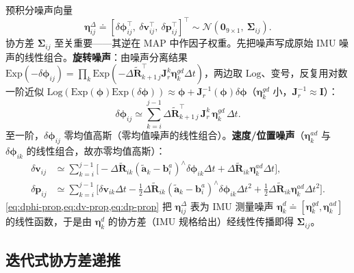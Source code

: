 预积分噪声向量
\begin{equation}
  \boldsymbol\eta_{ij}^\Delta\doteq[\delta\boldsymbol\phi_{ij}^\top,\ \delta\mathbf v_{ij}^\top,\ \delta\mathbf p_{ij}^\top]^\top\sim\mathcal N(\mathbf 0_{9\times1},\ \boldsymbol\Sigma_{ij}).
  \label{eq:imu-noise-vec}
\end{equation}
协方差 $\boldsymbol\Sigma_{ij}$ 至关重要——其逆在 MAP 中作因子权重。先把噪声写成原始 IMU 噪声的线性组合。\textbf{旋转噪声}：由噪声分离结果 $\mathrm{Exp}(-\delta\boldsymbol\phi_{ij})=\prod_k\mathrm{Exp}(-\Delta\tilde{\mathbf R}_{k+1\,j}^\top\mathbf J_r^k\boldsymbol\eta_k^{gd}\Delta t)$，两边取 $\mathrm{Log}$、变号，反复用对数一阶近似 $\mathrm{Log}(\mathrm{Exp}(\boldsymbol\phi)\mathrm{Exp}(\delta\boldsymbol\phi))\approx\boldsymbol\phi+\mathbf J_r^{-1}(\boldsymbol\phi)\delta\boldsymbol\phi$（$\boldsymbol\eta_k^{gd}$ 小，$\mathbf J_r^{-1}\approx\mathbf I$）：
\begin{equation}
  \delta\boldsymbol\phi_{ij}\simeq\sum_{k=i}^{j-1}\Delta\tilde{\mathbf R}_{k+1\,j}^\top\,\mathbf J_r^k\,\boldsymbol\eta_k^{gd}\,\Delta t.
  \label{eq:dphi-prop}
\end{equation}
至一阶，$\delta\boldsymbol\phi_{ij}$ 零均值高斯（零均值噪声的线性组合）。\textbf{速度/位置噪声}（$\boldsymbol\eta_k^{ad}$ 与 $\delta\boldsymbol\phi_{ik}$ 的线性组合，故亦零均值高斯）：
\begin{align}
  \delta\mathbf v_{ij}&\simeq\sum_{k=i}^{j-1}\Big[-\Delta\tilde{\mathbf R}_{ik}(\tilde{\mathbf a}_k-\mathbf b_i^a)^\wedge\delta\boldsymbol\phi_{ik}\Delta t+\Delta\tilde{\mathbf R}_{ik}\boldsymbol\eta_k^{ad}\Delta t\Big],\label{eq:dv-prop}\\
  \delta\mathbf p_{ij}&\simeq\sum_{k=i}^{j-1}\Big[\delta\mathbf v_{ik}\Delta t-\tfrac12\Delta\tilde{\mathbf R}_{ik}(\tilde{\mathbf a}_k-\mathbf b_i^a)^\wedge\delta\boldsymbol\phi_{ik}\Delta t^2+\tfrac12\Delta\tilde{\mathbf R}_{ik}\boldsymbol\eta_k^{ad}\Delta t^2\Big].\label{eq:dp-prop}
\end{align}
\cref{eq:dphi-prop,eq:dv-prop,eq:dp-prop} 把 $\boldsymbol\eta_{ij}^\Delta$ 表为 IMU 测量噪声 $\boldsymbol\eta_k^d\doteq[\boldsymbol\eta_k^{gd},\boldsymbol\eta_k^{ad}]$ 的线性函数，于是由 $\boldsymbol\eta_k^d$ 的协方差（IMU 规格给出）经线性传播即得 $\boldsymbol\Sigma_{ij}$。

\subsection{迭代式协方差递推}
\label{subsec:iter-cov}

